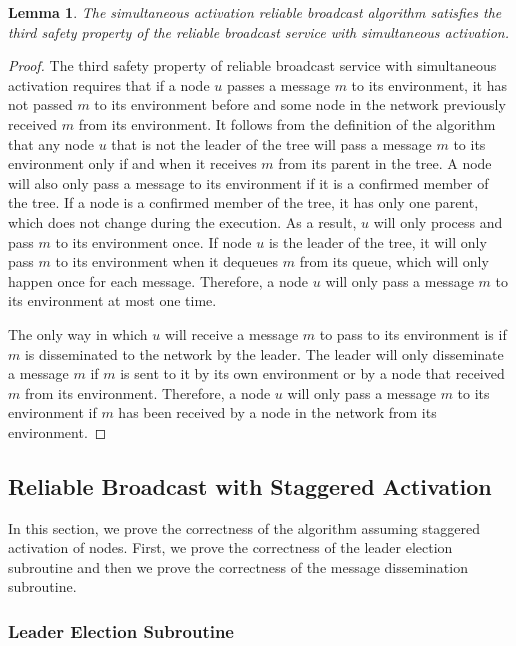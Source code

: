 \documentclass[english]{article}
\newtheorem{lemma}[theorem]{Lemma}
\begin{document}
\begin{lemma}
\label{StaticRBSafety3}
The simultaneous activation reliable broadcast algorithm satisfies the third safety property of the reliable broadcast service with simultaneous activation.
\end{lemma}
\begin{proof}

The third safety property of reliable broadcast service with simultaneous activation requires that if a node $u$ passes a message $m$ to its environment, it has not passed $m$ to its environment before and some node in the network previously received $m$ from its environment. It follows from the definition of  the algorithm that any node $u$ that is not the leader of the tree will pass a message $m$ to its environment only if and when it receives $m$ from its parent in the tree. A node will also only pass a message to its environment if it is a confirmed member of the tree. If a node is a confirmed member of the tree, it has only one parent, which does not change during the execution. As a result, $u$ will only process and pass $m$ to its environment once. If node $u$ is the leader of the tree, it will only pass $m$ to its environment when it dequeues $m$ from its queue, which will only happen once for each message. Therefore, a node $u$ will only pass a message $m$ to its environment at most one time.

The only way in which $u$ will receive a message $m$ to pass to its environment is if $m$ is disseminated to the network by the leader. The leader will only disseminate a message $m$ if $m$ is sent to it by its own environment or by a node that received $m$ from its environment. Therefore, a node $u$ will only pass a message $m$ to its environment if $m$ has been received by a node in the network from its environment.

\end{proof}



\subsection {Reliable Broadcast with Staggered Activation}

In this section, we prove the correctness of the algorithm assuming staggered activation of nodes. First, we prove the correctness of the leader election subroutine and then we prove the correctness of the message dissemination subroutine.

\subsubsection{Leader Election Subroutine}
\end{document}
